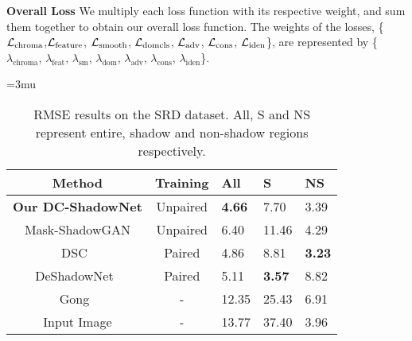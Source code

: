\documentclass[10pt,twocolumn,letterpaper]{article}
\begin{document}
\vspace{0.3cm}
\noindent \textbf{Overall Loss}
We multiply each loss function with its respective weight, and sum them together to obtain our overall loss function. The weights of the losses, \{$\mathcal{L}_{\rm chroma}$,$\mathcal{L}_{\rm feature}$, $\mathcal{L}_{\rm smooth}$, $\mathcal{L}_{\rm domcls}$, $\mathcal{L}_{\rm adv}$, $\mathcal{L}_{\rm cons}$, $\mathcal{L}_{\rm iden}$\}, are represented by \{$\lambda_\text{chroma}$, $\lambda_\text{feat}$, $\lambda_\text{sm}$, $\lambda_\text{dom}$, $\lambda_\text{adv}$, $\lambda_\text{cons}$, $\lambda_\text{iden}$\}.

\begin{table}[t!]
	\small
	\centering
	\thickmuskip=3mu
	\renewcommand{\arraystretch}{1.2}
	\caption {RMSE results on the SRD dataset. All, S and NS represent entire, shadow and non-shadow regions respectively.}
	\label{tb1:srd}
	\begin{tabularx}{\columnwidth}{ c|c|Y|Y|Y }
		\toprule
		Method                      &Training  &All    &S &NS\\
\hline
		\bf Our DC-ShadowNet        &Unpaired      &\bf4.66 &7.70 &3.39\\
Mask-ShadowGAN \cite{Hu19}  &Unpaired      &6.40   &11.46  &4.29\\
		\hline
		DSC~\cite{Hu18}				&Paired        &4.86   &8.81  &\bf3.23\\
DeShadowNet~\cite{Qu17}		&Paired		   &5.11   &\bf3.57   &8.82\\
		\hline
		Gong~\etal \cite{Gong14}    &-             &12.35  &25.43  &6.91\\
		\hline
		Input Image                 &-             &13.77 &37.40  &3.96\\
		\bottomrule
	\end{tabularx}	
\end{table}
\end{document}
